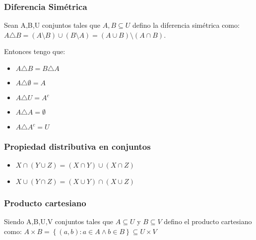 \documentclass{article}
\begin{document}
\subsubsection{Diferencia Simétrica}
Sean A,B,U conjuntos tales que $A,B \subseteq U$ defino la diferencia simétrica como: \begin{math}
    A \triangle B = (A \setminus B) \cup (B \setminus A) = (A \cup B) \setminus (A \cap B) 
\end{math}. 

Entonces tengo que: \begin{itemize}
    \item $A\triangle B = B \triangle A$
    \item $A \triangle \emptyset = A$
    \item $A\triangle U = A^c$
    \item $A\triangle A = \emptyset$
    \item $A \triangle A^c = U$
\end{itemize}

\subsubsection{Propiedad distributiva en conjuntos}
\begin{itemize}
    \item \begin{math}
        X \cap (Y \cup Z) = (X \cap Y) \cup (X \cap Z) 
    \end{math}
    \item \begin{math}
        X \cup (Y \cap Z) = (X \cup Y) \cap (X \cup Z)
    \end{math}
\end{itemize}

\subsubsection{Producto cartesiano}
Siendo A,B,U,V conjuntos tales que $A \subseteq U$ y $B \subseteq V$ defino el producto cartesiano como: \begin{math}
    A \times B = \left\{(a,b): a\in A \land b\in B\right\} \subseteq U\times V
\end{math}
\end{document}
